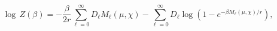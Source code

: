 \begin{equation}
\log \, Z\left(\beta \right)=-\frac{\beta }{2r}\sum _{\ell =0}^{\infty }D_{\ell }M_{\ell }\left(\mu ,\chi \right)-\sum _{\ell =0}^{\infty }D_{\ell }\log \left(1-e^{-\beta M_{\ell }\left(\mu ,\chi \right)/r}\right),\label{partition function II}\end{equation}

